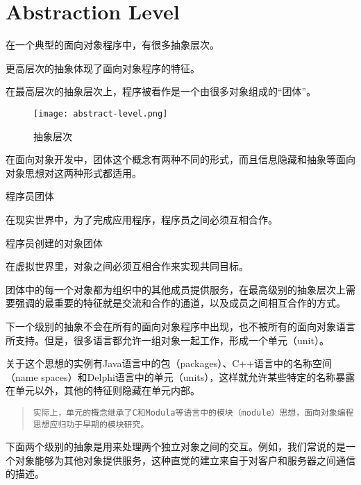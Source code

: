\section{Abstraction Level}


在一个典型的面向对象程序中，有很多抽象层次。

\begin{compactitem}
\item 更高层次的抽象体现了面向对象程序的特征。
\item 在最高层次的抽象层次上，程序被看作是一个由很多对象组成的“团体”。
\end{compactitem}


\begin{figure}[htbp]
\centering
\texttt{[image: abstract-level.png]}
\caption{抽象层次}
\label{fig:abstract-level}
\end{figure}


在面向对象开发中，团体这个概念有两种不同的形式，而且信息隐藏和抽象等面向对象思想对这两种形式都适用。

\begin{compactitem}
\item 程序员团体

在现实世界中，为了完成应用程序，程序员之间必须互相合作。
\item 程序员创建的对象团体

在虚拟世界里，对象之间必须互相合作来实现共同目标。
\end{compactitem}



团体中的每一个对象都为组织中的其他成员提供服务，在最高级别的抽象层次上需要强调的最重要的特征就是交流和合作的通道，以及成员之间相互合作的方式。

下一个级别的抽象不会在所有的面向对象程序中出现，也不被所有的面向对象语言所支持。但是，很多语言都允许一组对象一起工作，形成一个单元（unit）。

关于这个思想的实例有Java语言中的包（packages）、C++语言中的名称空间（name spaces）和Delphi语言中的单元（units），这样就允许某些特定的名称暴露在单元以外，其他的特征则隐藏在单元内部。

\begin{quote}
\texttt{实际上，单元的概念继承了C和Modula等语言中的模块（module）思想，面向对象编程思想应归功于早期的模块研究。}
\end{quote}


下面两个级别的抽象是用来处理两个独立对象之间的交互。例如，我们常说的是一个对象能够为其他对象提供服务，这种直觉的建立来自于对客户和服务器之间通信的描述。

